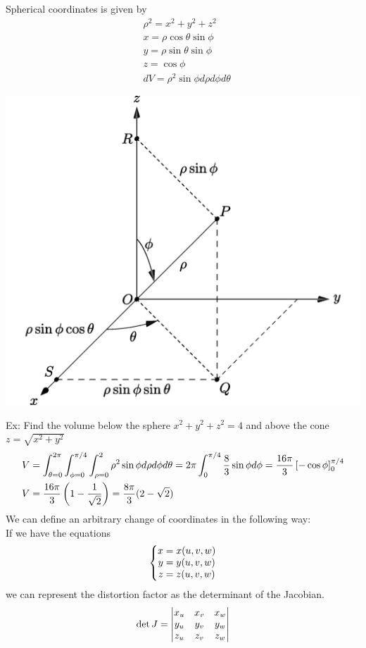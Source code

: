 \documentclass[11pt, fleqn]{article}
\begin{document}
Spherical coordinates is given by
\begin{align*}
    &\rho^2=x^2+y^2+z^2\\
    &x=\rho\cos\theta\sin\phi\\
    &y=\rho\sin\theta\sin\phi\\
    &z=\cos\phi\\
    &dV=\rho^2\sin\phi d\rho d\phi d\theta
\end{align*}
\centerline{\includegraphics[scale=0.3]{Math217Pictures/sphericalCoordinates.png}}
Ex: Find the volume below the sphere $x^2+y^2+z^2=4$ and above the cone $z=\sqrt{x^2+y^2}$
\begin{align*}
    &V=\int_{\theta=0}^{2\pi}\int_{\phi=0}^{\pi/4}\int_{\rho=0}^2\rho^2\sin\phi d\rho d\phi d\theta=2\pi\int_0^{\pi/4}\frac{8}{3}\sin\phi d\phi=\frac{16\pi}{3}\left[ -\cos\phi \right]_0^{\pi/4}\\
    &V=\frac{16\pi}{3}\left( 1-\frac{1}{\sqrt{2}} \right)=\frac{8\pi}{3}(2-\sqrt{2})
\end{align*}
We can define an arbitrary change of coordinates in the following way:\\
If we have the equations
$$\left\{\begin{matrix} x=x(u,v,w)\\ y=y(u,v,w)\\ z=z(u,v,w) \end{matrix}\right.$$
we can represent the distortion factor as the determinant of the Jacobian.
$$\det J=\left|\begin{matrix} x_u&x_v&x_w\\y_u&y_v&y_w\\z_u&z_v&z_w \end{matrix}\right|$$
\end{document}
